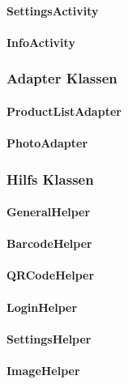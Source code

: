\documentclass{scrartcl}
\begin{document}
\paragraph{SettingsActivity}

\paragraph{InfoActivity}

\subsubsection{Adapter Klassen}

\paragraph{ProductListAdapter}

\paragraph{PhotoAdapter}

\subsubsection{Hilfs Klassen}

\paragraph{GeneralHelper}

\paragraph{BarcodeHelper}

\paragraph{QRCodeHelper}

\paragraph{LoginHelper}

\paragraph{SettingsHelper}

\paragraph{ImageHelper}
\end{document}

